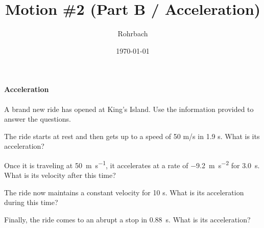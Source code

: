 \documentclass[10pt]{exam}
\title{Motion \#2 (Part B / Acceleration)}
\author{Rohrbach}
\date{\today}
\begin{document}
\maketitle

\vspace{-2em}
\begin{questions}

  

  \begin{EnvUplevel}
    \paragraph{Acceleration}
      A brand new ride has opened at King's Island.  Use the information provided to answer the questions.
  \end{EnvUplevel}

  \question
    The ride starts at rest and then gets up to a speed of 50 m/s in 1.9 s.  What is its acceleration?
    \vs

  \question
    Once it is traveling at \SI{50}{\meter\per\second}, it accelerates at a rate of \SI{-9.2}{\meter\per\second^2} for \SI{3.0}{\second}.  What is its velocity after this time?
    \vs

  \question
    The ride now maintains a constant velocity for 10 s.  What is its acceleration during this time?
    \vs

  \question
    Finally, the ride comes to an abrupt a stop in \SI{0.88}{\second}. What is its acceleration?
    \vs


 
\end{questions}
\end{document}
